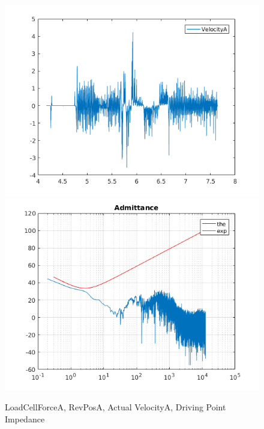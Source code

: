 \documentclass[letterpaper]{article}
\begin{document}
\begin{figure}[H]
	\includegraphics[scale=0.5]{adm_velocityA.png}\includegraphics[scale=0.5]{adm_impedance.png}
	\caption{LoadCellForceA, RevPosA, Actual VelocityA, Driving Point Impedance}
\end{figure}
\end{document}
